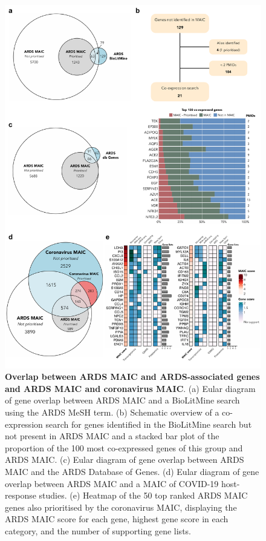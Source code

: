 \documentclass[
  11,
  a4paper,
]{article}
\begin{document}
\begin{figure}

{\centering \includegraphics{../img/Supplementary_Figure_3.png}

}

\caption{\textbf{Overlap between ARDS MAIC and ARDS-associated genes and
ARDS MAIC and coronavirus MAIC}. (a) Eular diagram of gene overlap
between ARDS MAIC and a BioLitMine search using the ARDS MeSH term. (b)
Schematic overview of a co-expression search for genes identified in the
BioLitMine search but not present in ARDS MAIC and a stacked bar plot of
the proportion of the 100 most co-expressed genes of this group and ARDS
MAIC. (c) Eular diagram of gene overlap between ARDS MAIC and the ARDS
Database of Genes. (d) Eular diagram of gene overlap between ARDS MAIC
and a MAIC of COVID-19 host-response studies. (e) Heatmap of the 50 top
ranked ARDS MAIC genes also prioritised by the coronavirus MAIC,
displaying the ARDS MAIC score for each gene, highest gene score in each
category, and the number of supporting gene lists.}

\end{figure}
\end{document}
